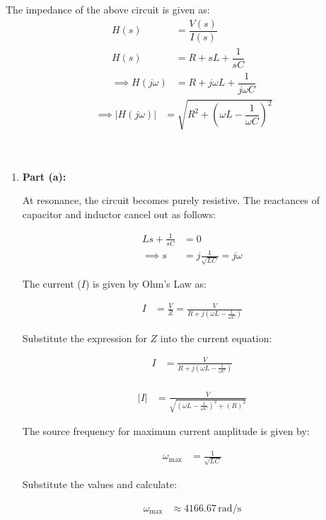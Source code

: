 \documentclass[journal,12pt,twocolumn]{IEEEtran}
\theoremstyle{remark}
\begin{document}
The impedance of the above circuit is given as:
\begin{align}
  H(s) &= \dfrac{V(s)}{I(s)}\\
     H(s) &= R + sL + \dfrac{1}{sC}\\
     \implies H(j\omega) &= R + j\omega L + \dfrac{1}{j\omega C}
\end{align}
\begin{align}
\implies \lvert H(j\omega) \rvert &= \sqrt{R^2 + \left(\omega L - \dfrac{1}{\omega C}\right)^2}
\end{align}\\\\
\begin{enumerate}
    \item \textbf{Part (a):}

    At resonance, the circuit becomes purely resistive. The reactances of capacitor and inductor cancel out as follows:

    \begin{align}
        Ls + \frac{1}{sC} &= 0 \\
        \implies s &= j\frac{1}{\sqrt{LC}} = j\omega
    \end{align}

    The current (\(I\)) is given by Ohm's Law as:

    \begin{align}
        I &= \frac{V}{Z} = \frac{V}{R + j(\omega L - \frac{1}{\omega C})}
    \end{align}

    Substitute the expression for \(Z\) into the current equation:

    \begin{align}
        I &= \frac{V}{R + j(\omega L - \frac{1}{\omega C})} \\
    \end{align}

    \begin{align}
        |I| &= \frac{V}{\sqrt{(\omega L- \frac{1}{\omega C})^2 + (R)^2}}
    \end{align}

    The source frequency for maximum current amplitude is given by:

    \begin{align}
        \omega_{\text{max}} &= \frac{1}{\sqrt{LC}}
    \end{align}

    Substitute the values and calculate:

    \begin{align}
        \omega_{\text{max}} &\approx 4166.67 \, \text{rad/s}
    \end{align}


\end{enumerate}
\end{document}
